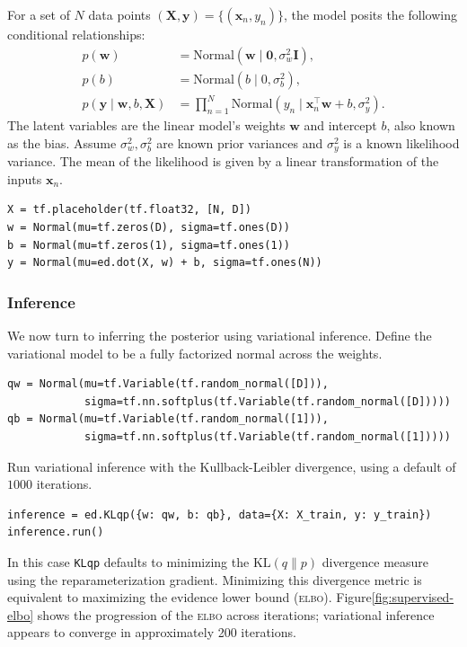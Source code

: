 For a set of $N$ data points $(\mathbf{X},\mathbf{y})=\{(\mathbf{x}_n, y_n)\}$,
the model posits the following conditional relationships:
\begin{align*}
  p(\mathbf{w})
  &=
  \text{Normal}(\mathbf{w} \mid \mathbf{0}, \sigma_w^2\mathbf{I}),
  \\[1.5ex]
  p(b)
  &=
  \text{Normal}(b \mid 0, \sigma_b^2),
  \\
  p(\mathbf{y} \mid \mathbf{w}, b, \mathbf{X})
  &=
  \prod_{n=1}^N
  \text{Normal}(y_n \mid \mathbf{x}_n^\top\mathbf{w} + b, \sigma_y^2).
\end{align*}
The latent variables are the linear model's weights $\mathbf{w}$ and
intercept $b$, also known as the bias.
Assume $\sigma_w^2,\sigma_b^2$ are known prior variances and $\sigma_y^2$ is a
known likelihood variance. The mean of the likelihood is given by a
linear transformation of the inputs $\mathbf{x}_n$.

\begin{lstlisting}
X = tf.placeholder(tf.float32, [N, D])
w = Normal(mu=tf.zeros(D), sigma=tf.ones(D))
b = Normal(mu=tf.zeros(1), sigma=tf.ones(1))
y = Normal(mu=ed.dot(X, w) + b, sigma=tf.ones(N))
\end{lstlisting}

\subsubsection{Inference}

We now turn to inferring the posterior using variational inference.
Define the variational model to be a fully factorized normal across
the weights.
\begin{lstlisting}
qw = Normal(mu=tf.Variable(tf.random_normal([D])),
            sigma=tf.nn.softplus(tf.Variable(tf.random_normal([D]))))
qb = Normal(mu=tf.Variable(tf.random_normal([1])),
            sigma=tf.nn.softplus(tf.Variable(tf.random_normal([1]))))
\end{lstlisting}

Run variational inference with the Kullback-Leibler divergence, using a
default of $1000$ iterations.
\begin{lstlisting}
inference = ed.KLqp({w: qw, b: qb}, data={X: X_train, y: y_train})
inference.run()
\end{lstlisting}
In this case \texttt{KLqp} defaults to minimizing the
$\text{KL}(q\|p)$ divergence measure using the reparameterization
gradient.
Minimizing this divergence metric is equivalent to maximizing the
evidence lower bound (\textsc{elbo}). Figure\nobreakspace \ref{fig:supervised-elbo} shows the
progression of the \textsc{elbo} across iterations; variational inference
appears to converge in approximately 200 iterations.

